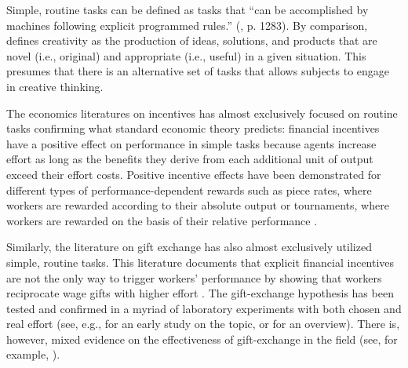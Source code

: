 
\label{lit}

Simple, routine tasks can be defined as tasks that 
``can be accomplished 
by machines following explicit programmed rules.'' (\citealp{Autor03QJE}, p. 1283). 
By comparison, \cite{Amabile1997} defines creativity as  the 
production of ideas, solutions, and products that are novel (i.e., original) 
and appropriate (i.e., useful) in a given situation. This presumes that there is an alternative set of tasks that   allows subjects to engage in creative thinking. 

The economics literatures on incentives has almost exclusively focused on routine tasks 
confirming what standard economic 
theory predicts: financial incentives have a positive effect 
on performance in simple tasks because agents increase effort as long
as the benefits they derive from each additional unit of output exceed their 
effort costs. 
Positive incentive effects 
have  been demonstrated for different types of performance-dependent rewards 
such as piece rates, where workers are rewarded according to their absolute output
 \citep[for instance,][]{Lazear00AER} or tournaments, where workers are rewarded 
on the basis of their relative performance \citep{Harbring2003}.

Similarly, the literature on gift exchange has also almost exclusively utilized simple, routine tasks. 
This literature documents that explicit financial incentives are not the only way 
to trigger workers' performance by showing that workers reciprocate wage gifts 
with higher effort \citep{Akerlof1982}.
The gift-exchange hypothesis has been tested and confirmed in a 
 myriad of laboratory experiments with both chosen and real effort 
(see, e.g., \citealp{Fehr1997} for an early study on the topic, or \citealp{Fehr00JEP} 
for an overview). There is, however, mixed evidence on the effectiveness of 
gift-exchange in the field (see, for example, \citealp{Gneezy06E}). 

